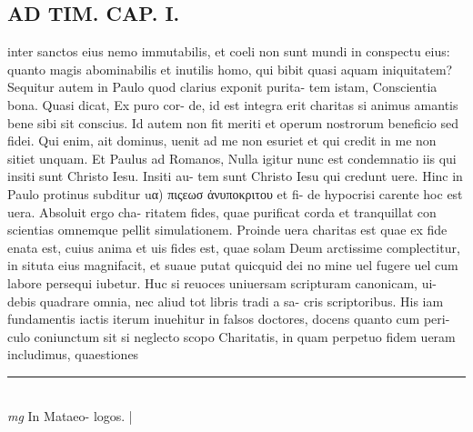 \documentclass{article}
\begin{document}
\begin{pages}
\section*{AD TIM. CAP. I. }
\marginpar{[ p.99 ]}\pstart inter sanctos eius nemo immutabilis, et coeli non sunt mundi in conspectu eius: quanto magis abominabilis et inutilis homo, qui bibit quasi aquam iniquitatem? Sequitur autem in Paulo quod clarius exponit purita- tem istam, Conscientia bona. Quasi dicat, Ex puro cor- de, id est integra erit charitas si animus amantis bene sibi sit conscius. Id autem non fit meriti et operum nostrorum beneficio sed fidei. Qui enim, ait dominus, uenit ad me non esuriet et qui credit in me non sitiet unquam. Et Paulus ad Romanos, Nulla igitur nunc est condemnatio iis qui insiti sunt Christo Iesu. Insiti au- tem sunt Christo Iesu qui credunt uere. Hinc in Paulo protinus subditur uα) πιςεωσ ἀνυποκριτου et fi- de hypocrisi carente hoc est uera. Absoluit ergo cha- ritatem fides, quae purificat corda et tranquillat con scientias omnemque pellit simulationem. Proinde uera charitas est quae ex fide enata est, cuius anima et uis fides est, quae solam Deum arctissime complectitur, in situta eius magnifacit, et suaue putat quicquid dei no mine uel fugere uel cum labore persequi iubetur. Huc si reuoces uniuersam scripturam canonicam, ui- debis quadrare omnia, nec aliud tot libris tradi a sa- cris scriptoribus. His iam fundamentis iactis iterum inuehitur in falsos doctores, docens quanto cum peri- culo coniunctum sit si neglecto scopo Charitatis, in quam perpetuo fidem ueram includimus, quaestiones  \pend
\vspace{0.5cm}\noindent
\vspace{0.2cm}\rule{1cm}{0.2pt}\\ 
\hspace{0.2cm}\textit{mg}
\footnotesize In Mataeo- logos. 
\normalsize| 

\end{pages}
\end{document}
